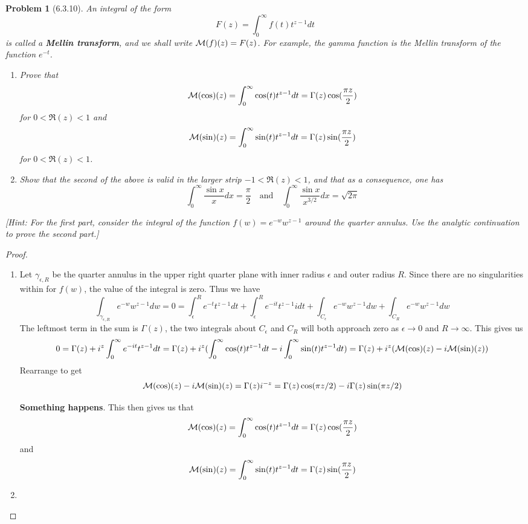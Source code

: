 \documentclass[10pt]{article}
\theoremstyle{plain}
\newtheorem{problem}{Problem}
\theoremstyle{remark}
\begin{document}
\begin{problem}[6.3.10]
  An integral of the form
  \[
    F(z)=\int_0^\infty f(t)t^{z-1}dt
  \]
  is called a \textbf{Mellin transform}, and we shall write
  ${\cal M}(f)(z)=F(z)$. For example, the gamma function is the Mellin
  transform of the function $e^{-t}$.
  \begin{enumerate}
  \item[(a)] Prove that
    \[
      {\cal M}(\cos)(z)=\int_0^\infty\cos(t)t^{z-1}dt=\Gamma(z)\cos(\frac{\pi z}{2})
    \]
    for $0<\Re(z)<1$ and
    \[
      {\cal M}(\sin)(z)=\int_0^\infty\sin(t)t^{z-1}dt=\Gamma(z)\sin(\frac{\pi z}{2})
    \]
    for $0<\Re(z)<1$.
  \item[(b)] Show that the second of the above is valid in the larger strip
    $-1<\Re(z)<1$, and that as a consequence, one has
    \[
      \int_0^\infty \frac{\sin x}{x}dx=\frac{\pi}{2}\quad \text{and}\quad \int_0^\infty\frac{\sin x}{x^{3/2}}dx=\sqrt{2\pi}
    \]
  \end{enumerate}
  [Hint: For the first part, consider the integral of the function
  $f(w)=e^{-w}w^{z-1}$ around the quarter annulus. Use the analytic continuation
  to prove the second part.]
\end{problem}

\begin{proof}
  \begin{enumerate}
  \item[(a)] Let $\gamma_{\epsilon,R}$ be the quarter annulus in the upper right quarter
    plane with inner radius $\epsilon$ and outer radius $R$. Since there are no
    singularities within for $f(w)$, the value of the integral is zero. Thus we have
    \[
      \int_{\gamma_{\epsilon,R}}e^{-w}w^{z-1}dw = 0 = \int_\epsilon^R e^{-t}t^{z-1}dt + \int_\epsilon^R e^{-it}t^{z-1}idt+\int_{C_\epsilon}e^{-w}w^{z-1}dw+\int_{C_R}e^{-w}w^{z-1}dw
    \]
    The leftmost term in the sum is $\Gamma(z)$, the two integrals about $C_\epsilon$ and $C_R$
    will both approach zero as $\epsilon\rightarrow 0$ and $R\rightarrow \infty$. This gives us
    \[
      0 = \Gamma(z)+i^z\int_0^\infty e^{-it}t^{z-1}dt=\Gamma(z)+i^z(\int_0^\infty\cos(t)t^{z-1}dt-i\int_0^\infty\sin(t)t^{z-1}dt)=\Gamma(z)+i^z({\cal M}(\cos)(z)-i{\cal M}(\sin)(z))
    \]
    Rearrange to get
    \[
      {\cal M}(\cos)(z)-i{\cal M}(\sin)(z)= \Gamma(z)i^{-z}=\Gamma(z)\cos(\pi z/2)-i\Gamma(z)\sin(\pi z/2)
    \]

    \textbf{Something happens}. This then gives us that
    \[
      {\cal M}(\cos)(z)=\int_0^\infty\cos(t)t^{z-1}dt=\Gamma(z)\cos(\frac{\pi z}{2})
    \]
    and
    \[
      {\cal M}(\sin)(z)=\int_0^\infty\sin(t)t^{z-1}dt=\Gamma(z)\sin(\frac{\pi z}{2})
    \]
  \item[(b)]
  \end{enumerate}
\end{proof}
\end{document}
